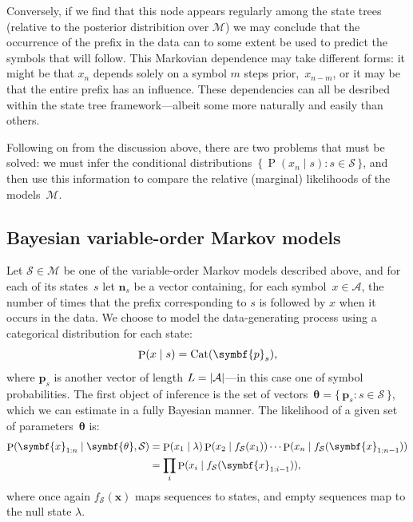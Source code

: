 \documentclass[12pt,a4paper]{article}
\newcommand\mc[1]{\mathcal{#1}}               %
\newcommand\ub[1]{\symbf{#1}}                 %
\DeclareMathOperator\Pb{P}                    %
\DeclarePairedDelimiter\lr{\lparen}{\rparen}  %
\DeclarePairedDelimiter\abs{\lvert}{\rvert}   %
\DeclareMathOperator\cat{Cat} %
\begin{document}
Conversely, if we find that this node appears regularly among the state trees
(relative to the posterior distribition over \(\mc{M}\)) we may conclude that
the occurrence of the prefix in the data can to some extent be used to predict
the symbols that will follow. This Markovian dependence may take different
forms: it might be that \(x_n\) depends solely on a symbol \(m\) steps
prior,~\(x_{n-m}\), or it may be that the entire prefix has an influence. These
dependencies can all be desribed within the state tree framework---albeit some
more naturally and easily than others.

Following on from the discussion above, there are two problems that must be
solved: we must infer the conditional distributions~\(\{\,\Pb(x_n \mid s) : s
\in \mc{S}\,\}\), and then use this information to compare the relative
(marginal) likelihoods of the models~\(\mc{M}\).

\subsection{Bayesian variable-order Markov models} %

Let \(\mc{S} \in \mc{M}\) be one of the variable-order Markov models described
above, and for each of its states~\(s\) let \(\ub{n}_s\) be a vector containing,
for each symbol~\(x \in \mc{A}\), the number of times that the prefix
corresponding to \(s\) is followed by \(x\) when it occurs in the data. We
choose to model the data-generating process using a categorical distribution for
each state:
\begin{equation*}
  \Pb\lr{x \mid s} = \cat\lr{\ub{p}_s},
\end{equation*}
where \(\ub{p}_s\) is another vector of length \(L = \abs{\mc{A}}\)---in this
case one of symbol probabilities. The first object of inference is the set of
vectors~\(\ub{\theta} = \{\,\ub{p}_s : s \in \mc{S}\,\}\), which we can estimate
in a fully Bayesian manner. The likelihood of a given set of
parameters~\(\ub{\theta}\) is:
\begin{align*}
  \Pb\lr{\ub{x}_{1:n} \mid \ub{\theta}, \mc{S}} &= \Pb\lr{x_1 \mid \lambda}
    \Pb\lr{x_2 \mid f_{\mc{S}}\lr{x_1}} \dotsm
    \Pb\lr{x_n \mid f_{\mc{S}}\lr{\ub{x}_{1:n-1}}} \\
  &= \prod_i \Pb\lr{x_i \mid f_{\mc{S}}\lr{\ub{x}_{1:i-1}}},
\end{align*}
where once again \(f_{\mc{S}}(\ub{x})\) maps sequences to states, and empty
sequences map to the null state \(\lambda\).
\end{document}
